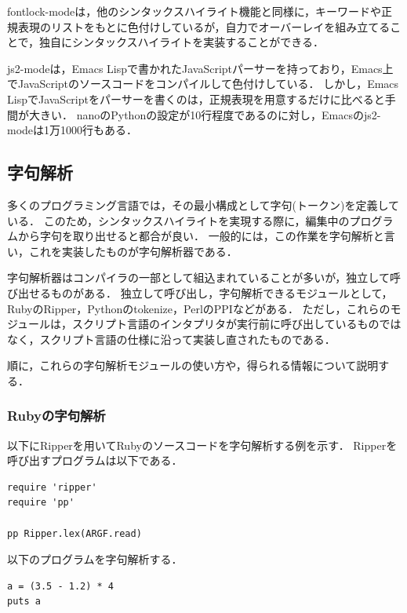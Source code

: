\documentclass{cs-thesis}
\begin{document}
  fontlock-modeは，他のシンタックスハイライト機能と同様に，キーワードや正規表現のリストをもとに色付けしているが，自力でオーバーレイを組み立てることで，独自にシンタックスハイライトを実装することができる．

  js2-modeは，Emacs Lispで書かれたJavaScriptパーサーを持っており，Emacs上でJavaScriptのソースコードをコンパイルして色付けしている．
  しかし，Emacs LispでJavaScriptをパーサーを書くのは，正規表現を用意するだけに比べると手間が大きい．
  nanoのPythonの設定が10行程度であるのに対し，Emacsのjs2-modeは1万1000行もある．

  \subsection{字句解析}
  多くのプログラミング言語では，その最小構成として字句(トークン)を定義している．
  このため，シンタックスハイライトを実現する際に，編集中のプログラムから字句を取り出せると都合が良い．
  一般的には，この作業を字句解析と言い，これを実装したものが字句解析器である\cite{bib:compiler}．

  字句解析器はコンパイラの一部として組込まれていることが多いが，独立して呼び出せるものがある．
  独立して呼び出し，字句解析できるモジュールとして，RubyのRipper，Pythonのtokenize，PerlのPPIなどがある．
  ただし，これらのモジュールは，スクリプト言語のインタプリタが実行前に呼び出しているものではなく，スクリプト言語の仕様に沿って実装し直されたものである．

  順に，これらの字句解析モジュールの使い方や，得られる情報について説明する．

  \subsubsection{Rubyの字句解析}

  以下にRipperを用いてRubyのソースコードを字句解析する例を示す．
  Ripperを呼び出すプログラムは以下である．

\begin{framed}
\begin{verbatim}
require 'ripper'
require 'pp'

pp Ripper.lex(ARGF.read)
\end{verbatim}
\end{framed}

以下のプログラムを字句解析する．

\begin{framed}
\begin{verbatim}
a = (3.5 - 1.2) * 4
puts a
\end{verbatim}
\end{framed}
\end{document}
